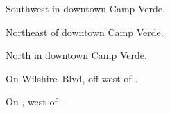 
\begin{LocationList}

Southwest in downtown Camp Verde.

Northeast of downtown Camp Verde.

North in downtown Camp Verde.

On Wilshire~Blvd, off  west of  .

\Location{\TruckStop \Gas \Rest}
On , west of  .

\end{LocationList}
